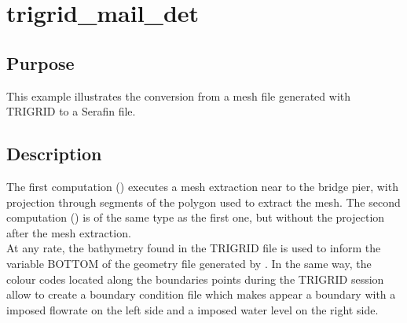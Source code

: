 \chapter{trigrid\_mail\_det}
%
%
\section{Purpose}
This example illustrates the conversion from a mesh file generated with
TRIGRID to a Serafin file.
%
\section{Description}
The first computation () executes a mesh extraction near
to the bridge pier, with projection through segments of the polygon used to
extract the mesh. The second computation () is of the
same type as the first one, but without the projection after the mesh
extraction.\\
At any rate, the bathymetry found in the TRIGRID file is used to inform the
variable BOTTOM of the geometry file generated by \stbtel. In the same way, the
colour codes located along the boundaries points during the TRIGRID session
allow \stbtel to create a boundary condition file which makes appear a boundary
with a imposed flowrate on the left side and a imposed water level on the right
side.

